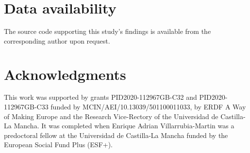 \documentclass[preprint,12pt]{elsarticle}
\begin{document}
\section*{Data availability}
The source code supporting this study’s findings is available from the corresponding author upon request.





\section*{Acknowledgments}

This work was supported by grants PID2020-112967GB-C32 and PID2020-112967GB-C33 funded by MCIN/AEI/10.13039/501100011033, by ERDF A Way of Making Europe and the Research Vice-Rectory of the Universidad de Castilla-La Mancha. It was completed when Enrique Adrian Villarrubia-Martin was a predoctoral fellow at the Universidad de Castilla-La Mancha funded by the European Social Fund Plus (ESF+).



\end{document}
